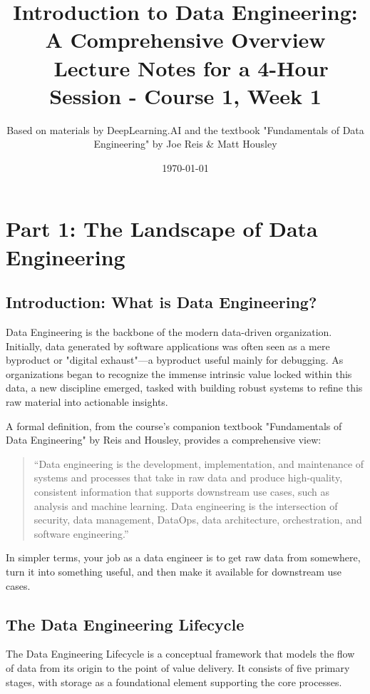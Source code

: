\documentclass{article}
\title{Introduction to Data Engineering: A Comprehensive Overview \ \large{Lecture Notes for a 4-Hour Session - Course 1, Week 1}}
\author{Based on materials by DeepLearning.AI and the textbook "Fundamentals of Data Engineering" by Joe Reis & Matt Housley}
\date{\today}
\begin{document}
\maketitle
\tableofcontents
\newpage


\section{Part 1: The Landscape of Data Engineering}

\subsection{Introduction: What is Data Engineering?}
Data Engineering is the backbone of the modern data-driven organization. Initially, data generated by software applications was often seen as a mere byproduct or "digital exhaust"—a byproduct useful mainly for debugging. As organizations began to recognize the immense intrinsic value locked within this data, a new discipline emerged, tasked with building robust systems to refine this raw material into actionable insights.

A formal definition, from the course's companion textbook "Fundamentals of Data Engineering" by Reis and Housley, provides a comprehensive view:
\begin{quote}
    “Data engineering is the development, implementation, and maintenance of systems and processes that take in raw data and produce high-quality, consistent information that supports downstream use cases, such as analysis and machine learning. Data engineering is the intersection of security, data management, DataOps, data architecture, orchestration, and software engineering.”
\end{quote}
In simpler terms, your job as a data engineer is to get raw data from somewhere, turn it into something useful, and then make it available for downstream use cases.

\subsection{The Data Engineering Lifecycle}
The Data Engineering Lifecycle is a conceptual framework that models the flow of data from its origin to the point of value delivery. It consists of five primary stages, with storage as a foundational element supporting the core processes.
\end{document}

